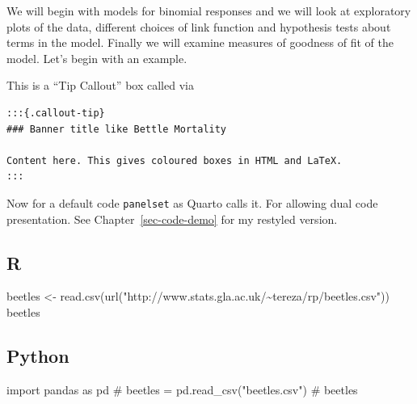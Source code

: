\documentclass[
  a4paper,
  DIV=11,
  numbers=noendperiod,
  oneside]{scrreport}
\newenvironment{Shaded}{\begin{snugshade}}{\end{snugshade}}
\newcommand{\CommentTok}[1]{\textcolor[rgb]{0.37,0.37,0.37}{#1}}
\newcommand{\FunctionTok}[1]{\textcolor[rgb]{0.28,0.35,0.67}{#1}}
\newcommand{\ImportTok}[1]{\textcolor[rgb]{0.00,0.46,0.62}{#1}}
\newcommand{\NormalTok}[1]{\textcolor[rgb]{0.00,0.23,0.31}{#1}}
\newcommand{\OtherTok}[1]{\textcolor[rgb]{0.00,0.23,0.31}{#1}}
\newcommand{\StringTok}[1]{\textcolor[rgb]{0.13,0.47,0.30}{#1}}
\begin{document}
We will begin with models for binomial responses and we will look at
exploratory plots of the data, different choices of link function and
hypothesis tests about terms in the model. Finally we will examine
measures of goodness of fit of the model. Let's begin with an example.

\begin{tcolorbox}[enhanced jigsaw, coltitle=black, leftrule=.75mm, bottomtitle=1mm, colframe=quarto-callout-tip-color-frame, opacitybacktitle=0.6, colback=white, toprule=.15mm, colbacktitle=quarto-callout-tip-color!10!white, toptitle=1mm, titlerule=0mm, title=\textcolor{quarto-callout-tip-color}{\faLightbulb}\hspace{0.5em}{Beetle mortality}, arc=.35mm, opacityback=0, rightrule=.15mm, bottomrule=.15mm, breakable, left=2mm]

This is a ``Tip Callout'' box called via

\begin{verbatim}
:::{.callout-tip}
### Banner title like Bettle Mortality

Content here. This gives coloured boxes in HTML and LaTeX.
:::
\end{verbatim}

Now for a default code \texttt{panelset} as Quarto calls it. For
allowing dual code presentation. See Chapter~\ref{sec-code-demo} for my
restyled version.

\subsection{R}

\begin{Shaded}
\begin{Highlighting}[]
\NormalTok{beetles }\OtherTok{\textless{}{-}} \FunctionTok{read.csv}\NormalTok{(}\FunctionTok{url}\NormalTok{(}\StringTok{"http://www.stats.gla.ac.uk/\textasciitilde{}tereza/rp/beetles.csv"}\NormalTok{))}
\NormalTok{beetles}
\end{Highlighting}
\end{Shaded}

\subsection{Python}

\begin{Shaded}
\begin{Highlighting}[]
\ImportTok{import}\NormalTok{ pandas }\ImportTok{as}\NormalTok{ pd}
\CommentTok{\# beetles = pd.read\_csv("beetles.csv")}
\CommentTok{\# beetles}
\end{Highlighting}
\end{Shaded}

\end{tcolorbox}
\end{document}
